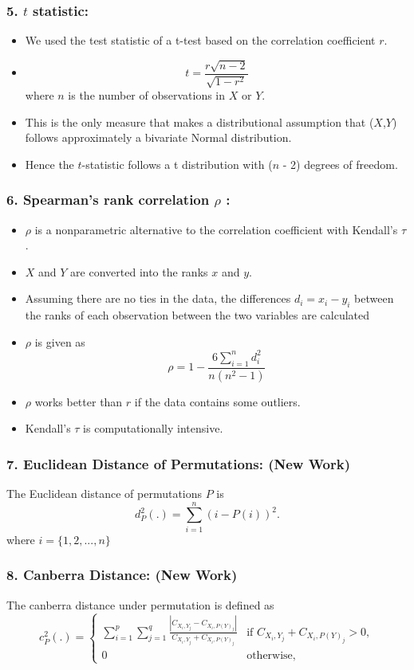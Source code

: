 \documentclass{beamer}
\begin{document}
\begin{frame}
\frametitle{5. $t$ statistic: }
\begin{itemize}
\item We used the test statistic of a t-test based on the correlation coefficient $r$. 
\item  $$t =\frac{r \sqrt{n - 2}}{\sqrt{1 - r^2}}$$ where $n$ is the number of observations in $X$ or $Y$. 
\item This is the only measure that makes a distributional assumption that ($X$,$Y$) follows approximately a bivariate Normal distribution. 
\item Hence the $t$-statistic follows a t distribution with ($n$ - 2) degrees of freedom.
\end{itemize}
\end{frame}

\begin{frame}
\frametitle{6. Spearman's rank correlation $\rho$ : }
\begin{itemize}
\item $\rho$ is a nonparametric alternative to the correlation coefficient with Kendall's $\tau$. 
\item $X$ and $Y$ are converted into the ranks $x$ and $y$. 
\item Assuming there are no ties in the data, the differences $d_i=x_i - y_i$ between the ranks of each observation between the two variables are calculated 
\item $\rho$ is given as $$\rho = 1 - \frac{6\sum_{i=1}^n d_i^2}{n(n^2 - 1)}$$ 
\item $\rho$ works better than $r$ if the data contains some outliers. 
\item Kendall's $\tau$ is computationally intensive.
\end{itemize}
\end{frame}

\begin{frame}
\frametitle{7. Euclidean Distance of Permutations: (New Work)}

The Euclidean distance of permutations $P$ is 
\[
d^2_P(.) = \sum_{i=1}^n ( i - P(i))^2.
\]
where $i = \{1, 2, ..., n\}$

\end{frame}

\begin{frame}
\frametitle{8. Canberra Distance: (New Work)}
The canberra distance under permutation is defined as
\[
c^2_P(.)  = \left \{ 
\begin{array}{ll}
\sum_{i=1}^p \sum_{j=1}^q \frac{ |C_{X_i,Y_j} - C_{X_i,P(Y)_j}|}{ C_{X_i,Y_j} + C_{X_i,P(Y)_j}} & \text{if } C_{X_i,Y_j} + C_{X_i,P(Y)_j} > 0,\\
0 & \text{otherwise},
\end{array} \right.
\]

\end{frame}
\end{document}
